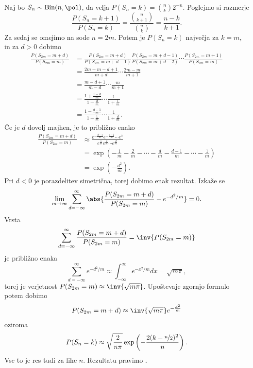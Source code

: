 
Naj bo $S_n \sim \operatorname{Bin}(n, \pol)$, da velja $P(S_n = k) =
\binom{n}{k} 2^{-n}$.
Poglejmo si razmerje
\[
  \frac{P(S_n = k+1)}{P(S_n = k)}
  = \frac{\binom{n}{k+1}}{\binom{n}{k}}
  = \frac{n-k}{k+1}.
\]
Za sedaj se omejimo na sode $n = 2m$.
Potem je $P(S_n = k)$ največja za $k=m$, in za $d > 0$ dobimo
\begin{align*}
  \frac{P(S_{2m} = m+d)}{P(S_{2m} = m)}
  &= \frac{P(S_{2m} = m+d)}{P(S_{2m} = m+d-1)} \frac{P(S_{2m} = m+d-1)}{P(S_{2m}
	= m+d-2)} \cdots \frac{P(S_{2m} = m+1)}{P(S_{2m} = m)} \\
  &= \frac{2m - m - d +1}{m+d} \cdots \frac{2m-m}{m+1} \\
  &= \frac{m - d + 1}{m - d} \cdots \frac{m}{m+1} \\
  &= \frac{1 + \frac{1-d}{m}}{1 + \frac{d}{m}} \cdots \frac{1}{1 + \frac{1}{m}} \\
  &= \frac{1 - \frac{d-1}{m}}{1 + \frac{1}{m}} \cdots \frac{1}{1 + \frac{d}{m}}.
\end{align*}
Če je $d$ dovolj majhen, je to približno enako
\begin{align*}
  \frac{P(S_{2m} = m+d)}{P(S_{2m} = m)}
  &\approx \frac{e^{- \frac{d-1}{m}} e^{- \frac{d-2}{m}}\cdots e^0}{e^{\frac{1}{m}} e^{\frac{2}{m}} \cdots e^{\frac{d}{m}}} \\
  &= \exp\left( - \frac{1}{m} - \frac{2}{m} - \cdots - \frac{d}{m} - \frac{d-1}{m} - \cdots - \frac{1}{m} \right) \\
  &= \exp\left( -\frac{d^2}{m} \right).
\end{align*}
Pri $d < 0$ je porazdelitev simetrična, torej dobimo enak rezultat.
Izkaže se
\[
  \lim_{m \to \infty} \sum_{d = -\infty}^\infty \abs{ \frac{P(S_{2m} =
	  m+d)}{P(S_{2m} = m)} - e^{-d^2 / m} } = 0.
\]
Vrsta
\[
  \sum_{d = -\infty}^\infty \frac{P(S_{2m} = m+d)}{P(S_{2m} = m)} =
  \inv{P(S_{2m} = m)}
\]
je približno enaka
\[
  \sum_{d = -\infty}^\infty e^{-d^2/m} \approx \int_{-\infty}^\infty e^{-x^2 /
	m} dx = \sqrt{m\pi},
\]
torej je verjetnost $P(S_{2m} = m) \approx \inv{\sqrt{m \pi}}$.
Upoštevaje zgornjo formulo potem dobimo
\[
  P(S_{2m} = m+d) \approx \inv{\sqrt{m \pi}} e^{- \frac{d^2}{m}}
\]
oziroma
\[
  P(S_n = k) \approx \sqrt{\frac{2}{n \pi}} \exp\left( - \frac{2
	  (k-\nicefrac{n}{2})^2}{n} \right).
\]
Vse to je res tudi za lihe $n$.
Rezultatu pravimo .


